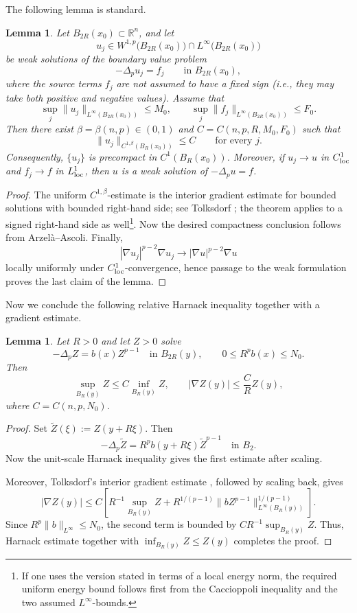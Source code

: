 \documentclass[reqno,12pt]{amsart}
\numberwithin{equation}{section}
\newtheorem{lem}[thm]{Lemma}
\theoremstyle{remark}
\begin{document}
The following lemma is standard. 
\begin{lem}
\label{lem:uniform-C1-compactness}
Let $B_{2R}(x_0)\subset\mathbb{R}^n$, and let
$$
u_j \in W^{1,p}\bigl(B_{2R}(x_0)\bigr)\cap L^\infty\bigl(B_{2R}(x_0)\bigr)
$$
be weak solutions of the boundary value problem
$$
-\Delta_p u_j = f_j \qquad \text{in } B_{2R}(x_0),
$$
where the source terms $f_j$ are not assumed to have a fixed sign (i.e., they may take both positive and negative values). Assume that
$$
\sup_j\|u_j\|_{L^\infty(B_{2R}(x_0))}\le M_0,
\qquad \sup_j\|f_j\|_{L^\infty(B_{2R}(x_0))}\le F_0.
$$
Then there exist $\beta=\beta(n,p)\in(0,1)$ and
$C=C(n,p,R,M_0,F_0)$ such that
$$
\|u_j\|_{C^{1,\beta}(B_R(x_0))}\le C \qquad\text{for every }j.
$$
Consequently, $\{u_j\}$ is precompact in $C^1(B_R(x_0))$.
Moreover, if $u_j\to u$ in $C^1_{\rm loc}$ and
$f_j\to f$ in $L^1_{\rm loc}$, then $u$ is a weak solution of
$-\Delta_pu=f$.
\end{lem}

\begin{proof}
The uniform $C^{1,\beta}$-estimate is the interior gradient estimate for bounded solutions with bounded right-hand side; see Tolksdorf \cite[Section~2]{T1984}; the theorem applies to a signed right-hand side as well\footnote{If one uses the version stated in terms of a local energy norm, the required
uniform energy bound follows first from the Caccioppoli inequality and the two assumed $L^\infty$-bounds.}.  Now the desired compactness conclusion follows from Arzel\`a--Ascoli.  Finally,
$$
|\nabla u_j|^{p-2}\nabla u_j \to |\nabla u|^{p-2}\nabla u
$$
locally uniformly under $C^1_{\rm loc}$-convergence, hence passage to the weak formulation proves the last claim of the lemma.
\end{proof}



Now we conclude the following relative Harnack inequality together with a gradient estimate.
\begin{lem} 
\label{lem:relative-gradient}
Let $R>0$ and let $Z>0$ solve
$$
-\Delta_pZ=b(x)Z^{p-1} \quad\text{in }B_{2R}(y),
\qquad 0\le R^p b(x)\le N_0.
$$
Then
$$
\sup_{B_R(y)}Z\le C\inf_{B_R(y)}Z,
\qquad |\nabla Z(y)|\le \frac{C}{R}Z(y),
$$
where $C=C(n,p,N_0)$.
\end{lem}

\begin{proof}
Set $\widetilde Z(\xi):=Z(y+R\xi)$. Then
$$
-\Delta_p\widetilde Z =R^pb(y+R\xi)\widetilde Z^{p-1} \quad\text{in }B_2.
$$
Now the unit-scale Harnack inequality gives the first estimate after scaling.

Moreover, Tolksdorf's interior gradient estimate \cite{T1984}, followed by scaling back, gives
$$
|\nabla Z(y)|\le C\left[ R^{-1}\sup_{B_R(y)}Z +R^{1/(p-1)}
\|bZ^{p-1}\|_{L^\infty(B_R(y))}^{1/(p-1)} \right].
$$
Since $R^p\|b\|_{L^\infty}\le N_0$, the second term is bounded by $CR^{-1}\sup_{B_R(y)}Z$. 
Thus, Harnack estimate together with
$\inf_{B_R(y)}Z\le Z(y)$ completes the proof.
\end{proof}
\end{document}
